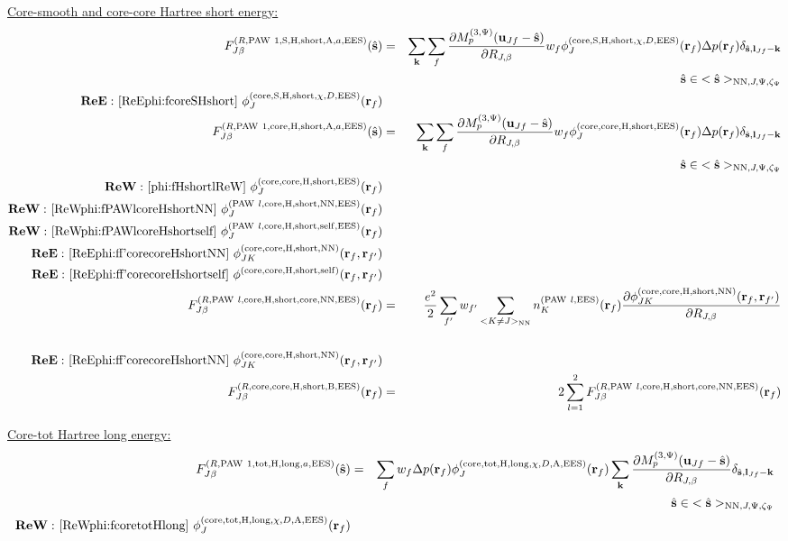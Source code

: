 \documentclass[paper=a4, fontsize=11pt]{article} %
\numberwithin{equation}{section} %
\numberwithin{figure}{section} %
\numberwithin{table}{section} %
\newcommand{\p}{\partial}
\newcommand{\bu}{{\bf{u}}}
\newcommand{\bl}{{\bf{l}}}
\newcommand{\bk}{{\bf{k}}}
\newcommand{\bs}{{\bf{s}}}
\newcommand{\br}{{\bf{r}}}
\newcommand{\hs}{{\hat{\bf{s}}}}
\newcommand{\rS}{{\mathrm{S}}}
\newcommand{\rEES}{{\mathrm{EES}}}
\newcommand{\rcore}{{\mathrm{core}}}
\newcommand{\rNN}{{\mathrm{NN}}}
\newcommand{\rself}{{\mathrm{self}}}
\newcommand{\rshort}{{\mathrm{short}}}
\newcommand{\rlong}{{\mathrm{long}}}
\newcommand{\rP}{{\mathrm{PAW}}}
\newcommand{\rH}{{\mathrm{H}}}
\newcommand{\rA}{{\mathrm{A}}}
\newcommand{\rB}{{\mathrm{B}}}
\newcommand{\rtot}{{\mathrm{tot}}}
\newcommand{\RJb}{{R_{J,\beta}}}
\newcommand{\Mp}{{M_p^{(3,\Psi)}}}
\newcommand{\hsJp}{{<\hs>_{\rNN,J,\Psi,\zeta_\Psi}}}
\newcommand{\hsinJp}{{\ \ \ \ \ \hs  \in  \hsJp}}
\newcommand{\ReE}{{{\bf ReE:\ }}}
\newcommand{\ReW}{{{\bf ReW:\ }}}
\begin{document}
\underline{Core-smooth and core-core Hartree short energy:}
\begin{eqnarray}
\label{FJb:sRPAW1SHshortAa}
F_{J\beta}^{(R,\rP\ 1,\rS,\rH,\rshort,\rA,a,\rEES)}(\hs)
&=& \sum_{\bk}\sum_f  \frac{\p \Mp(\bu_{Jf}-\hat \bs)}{\p \RJb}w_f \phi_J^{(\rcore,\rS,\rH,\rshort,\chi,D,\rEES)}(\br_f)\Delta p(\br_f)\delta_{\hat \bs,\bl_{Jf}-\bk} \nonumber\\
&\ & \hspace*{2in} \hsinJp \\
\ReE \eqref{ReEphi:fcoreSHshort}\ \phi_J^{(\rcore,\rS,\rH,\rshort,\chi,D,\rEES)}(\br_f) \nonumber \\
\label{FJb:sRPAW1coreHshortAa}
F_{J\beta}^{(R,\rP\ 1,\rcore,\rH,\rshort,\rA,a,\rEES)}(\hs)
&=&\sum_{\bk}\sum_f  \frac{\p \Mp(\bu_{Jf}-\hat \bs)}{\p \RJb}w_f \phi_J^{(\rcore,\rcore,\rH,\rshort,\rEES)}(\br_f)  \Delta p(\br_f)\delta_{\hat \bs,\bl_{Jf}-\bk} \nonumber\\
&\ & \hspace*{2in} \hsinJp \\ 
\ReW \eqref{phi:fHshortlReW}\ \phi_J^{(\rcore,\rcore,\rH,\rshort,\rEES)}(\br_f) \nonumber \\ 
\ReW \eqref{ReWphi:fPAWlcoreHshortNN}\ \phi_J^{(\rP\ l,\rcore,\rH,\rshort,\rNN,\rEES)}(\br_f) \nonumber \\
\ReW \eqref{ReWphi:fPAWlcoreHshortself}\ \phi_J^{(\rP\ l,\rcore,\rH,\rshort,\rself,\rEES)}(\br_f) \nonumber \\
\ReE \eqref{ReEphi:ff'corecoreHshortNN}\ \phi_{JK}^{(\rcore,\rcore,\rH,\rshort,\rNN)}(\br_f,\br_{f'}) \nonumber \\
\ReE \eqref{ReEphi:ff'corecoreHshortself}\ \phi^{(\rcore,\rcore,\rH,\rshort,\rself)}(\br_f,\br_{f'}) \nonumber \\
F_{J\beta}^{(R,\rP\ l,\rcore,\rH,\rshort,\rcore,\rNN,\rEES)}(\br_f)&=&\frac{e^2}{2}\sum_{f'}w_{f'}\sum_{<K \neq J>_\rNN}n_{K}^{(\rP\ l,\rEES)}(\br_f) \frac{\p \phi_{JK}^{(\rcore,\rcore,\rH,\rshort,\rNN)}(\br_f,\br_{f'})}{\p \RJb} \nonumber\\ \\
\ReE \eqref{ReEphi:ff'corecoreHshortNN}\ \phi_{JK}^{(\rcore,\rcore,\rH,\rshort,\rNN)}(\br_f,\br_{f'}) \nonumber \\
\label{gr:FRcorecoreHshort}
F_{J\beta}^{(R,\rcore,\rcore,\rH,\rshort,\rB,\rEES)}(\br_f)&=& 2\sum_{l=1}^2F_{J\beta}^{(R,\rP\ l,\rcore,\rH,\rshort,\rcore,\rNN,\rEES)}(\br_f)
\end{eqnarray}

\underline{Core-tot Hartree long energy:}
\begin{eqnarray}
\label{FJb:sRPAW1totHlonga}
F_{J\beta}^{(R,\rP\ 1,\rtot,\rH,\rlong,a,\rEES)}(\hs) &=& \sum_f w_f \Delta p(\br_f) \phi_J^{(\rcore,\rtot,\rH,\rlong,\chi,D,\rA,\rEES)}(\br_f) \sum_{\bk} \frac{\p \Mp(\bu_{Jf}-\hat \bs)}{\p \RJb} \delta_{\hat \bs,\bl_{Jf}-\bk} \nonumber\\ 
&& \hspace*{2.5in} \hsinJp \\
\ReW \eqref{ReWphi:fcoretotHlong}\ \phi_J^{(\rcore,\rtot,\rH,\rlong,\chi,D,\rA,\rEES)}(\br_f) \nonumber
\end{eqnarray}
\end{document}
